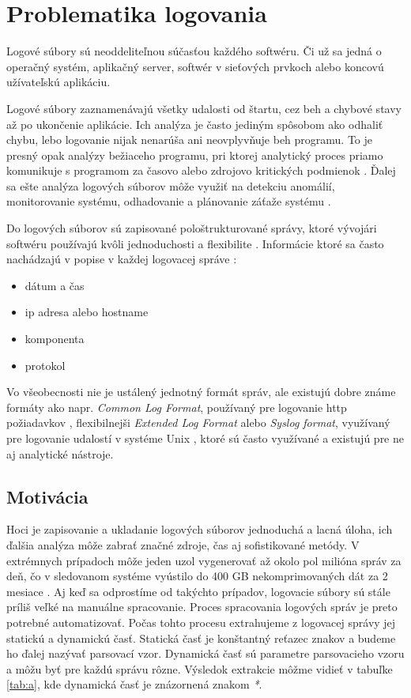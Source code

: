 \chapter{Problematika logovania}

Logové súbory sú neoddeliteľnou súčasťou každého softwéru. Či už sa jedná o operačný systém, aplikačný server, softwér v sieťových prvkoch alebo koncovú užívateľskú aplikáciu. 
\par Logové súbory zaznamenávajú všetky udalosti od štartu, cez beh a chybové stavy až po ukončenie aplikácie. Ich analýza je často jediným spôsobom ako odhaliť chybu, lebo logovanie nijak nenarúša ani neovplyvňuje beh programu. To je presný opak analýzy bežiaceho programu, pri ktorej analytický proces priamo komunikuje s programom za časovo alebo zdrojovo kritických podmienok  \parencite{jvaldman} . Ďalej sa ešte analýza logových súborov môže využiť na detekciu anomálií, monitorovanie systému, odhadovanie a plánovanie záťaže systému \parencite{logengineering}.
\par Do logových súborov sú zapisované pološtrukturované správy, ktoré vývojári softwéru používajú kvôli jednoduchosti a flexibilite \parencite{he2016, ibm}. Informácie ktoré sa často nachádzajú v popise v každej logovacej správe \parencite{weblog, datapreprocessing, sshd}:
\begin{itemize}
  \item dátum a čas
  \item ip adresa alebo hostname
  \item komponenta
  \item protokol
\end{itemize}
\par Vo všeobecnosti nie je ustálený jednotný formát správ, ale existujú dobre známe formáty ako napr. \emph{Common Log Format}, používaný pre logovanie http požiadavkov \parencite{CLF} , flexibilnejši \emph{Extended Log Format} \parencite{ELF} alebo \emph{Syslog format}, využívaný pre logovanie udalostí v systéme Unix \parencite{syslog}, ktoré sú často využívané a existujú pre ne aj analytické nástroje. \

\section{Motivácia}

\par Hoci je zapisovanie a ukladanie logových súborov jednoduchá a lacná úloha, ich ďalšia analýza môže zabrať značné zdroje, čas aj sofistikované metódy. V extrémnych prípadoch môže jeden uzol vygenerovať až okolo pol milióna správ za deň, čo v sledovanom systéme vyústilo do 400 GB nekomprimovaných dát za 2 mesiace \parencite{google}. Aj keď sa odprostíme od takýchto prípadov, logovacie súbory sú stále príliš veľké na manuálne spracovanie.  Proces spracovania logových správ je preto potrebné  automatizovať. Počas tohto procesu extrahujeme z logovacej správy jej statickú a dynamickú časť. Statická časť je konštantný reťazec znakov a budeme ho ďalej nazývať parsovací vzor. Dynamická časť sú parametre parsovacieho vzoru a môžu byť pre každú správu rôzne. Výsledok extrakcie môžme vidieť v tabuľke \ref{tab:a}, kde dynamická časť je znázornená znakom \emph{*}. 

